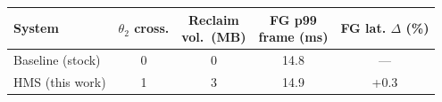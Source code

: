 \begin{tabular}{lcccc}
\toprule
System & \makecell{$\theta_2$\\cross.} & \makecell{Reclaim\\vol.\ (MB)} & \makecell{FG p99\\frame (ms)} & \makecell{FG lat.\\$\Delta$ (\%)} \\
\midrule
Baseline (stock) & 0 & 0 & 14.8 & --- \\
HMS (this work) & 1 & 3 & 14.9 & +0.3 \\
\bottomrule
\end{tabular}
